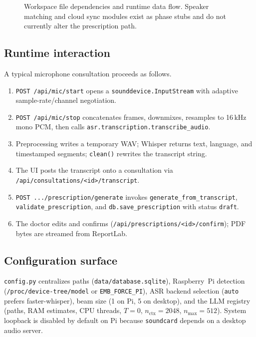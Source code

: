 \documentclass[11pt,a4paper]{article}
\begin{document}
\begin{figure}[htbp]
\caption{Workspace file dependencies and runtime data flow. Speaker matching and cloud sync modules exist as phase stubs and do not currently alter the prescription path.}
\label{fig:arch}
\end{figure}

\subsection{Runtime interaction}
A typical microphone consultation proceeds as follows.
\begin{enumerate}[leftmargin=1.4em]
  \item \texttt{POST /api/mic/start} opens a \texttt{sounddevice.InputStream} with adaptive sample-rate/channel negotiation.
  \item \texttt{POST /api/mic/stop} concatenates frames, downmixes, resamples to 16\,kHz mono PCM, then calls \texttt{asr.transcription.transcribe\_audio}.
  \item Preprocessing writes a temporary WAV; Whisper returns text, language, and timestamped segments; \texttt{clean()} rewrites the transcript string.
  \item The UI posts the transcript onto a consultation via \texttt{/api/consultations/<id>/transcript}.
  \item \texttt{POST .../prescription/generate} invokes \texttt{generate\_from\_transcript}, \texttt{validate\_prescription}, and \texttt{db.save\_prescription} with status \texttt{draft}.
  \item The doctor edits and confirms (\texttt{/api/prescriptions/<id>/confirm}); PDF bytes are streamed from ReportLab.
\end{enumerate}

\subsection{Configuration surface}
\texttt{config.py} centralizes paths (\texttt{data/database.sqlite}), Raspberry~Pi detection (\texttt{/proc/device-tree/model} or \texttt{EMB\_FORCE\_PI}), ASR backend selection (\texttt{auto} prefers faster-whisper), beam size (1 on Pi, 5 on desktop), and the LLM registry (paths, RAM estimates, CPU threads, $T=0$, $n_{\text{ctx}}=2048$, $n_{\text{max}}=512$). System loopback is disabled by default on Pi because \texttt{soundcard} depends on a desktop audio server.
\end{document}
